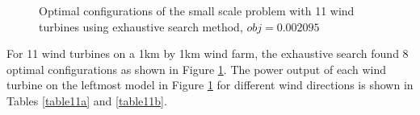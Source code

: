 \begin{figure}[H]
            \qquad
            \qquad
            \caption{Optimal configurations of the small scale problem with 11 wind turbines using exhaustive search method, $obj=0.002095$}
            \label{small11}
        \end{figure}
        
        For 11 wind turbines on a 1km by 1km wind farm, the exhaustive search found 8 optimal configurations as shown in Figure \ref{small11}. The power output of each wind turbine on the leftmost model in Figure \ref{small11} for different wind directions is shown in Tables \ref{table11a} and \ref{table11b}.
        
